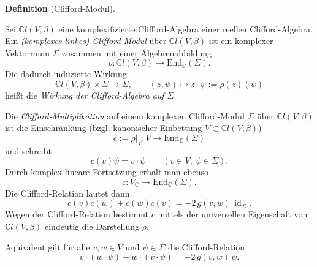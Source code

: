 \documentclass[10pt, letterpaper]{article}
\newcommand{\id}{\operatorname{id}}
\newcommand{\C}{\mathbb{C}}
\newcommand{\End}{\mathrm{End}}
\newcommand{\CustomHeading}[3]{%
  \par\medskip\noindent%
  \textbf{#1 #2} \textnormal{(#3)}.\enskip%
}
\newenvironment{DEF}[2]{\CustomHeading{Definition}{#1}{#2}}{}
\begin{document}
\begin{DEF}{}{Clifford-Modul}
Sei $\C l(V,\beta)$ eine komplexifizierte Clifford-Algebra einer reellen Clifford-Algebra. Ein \emph{(komplexes linkes) Clifford-Modul} über $\C l(V,\beta)$ ist ein komplexer Vektorraum $\Sigma$
zusammen mit einer Algebrenabbildung
\[
\rho:\C l(V,\beta)\longrightarrow \End_{\C}(\Sigma).
\]
Die dadurch induzierte Wirkung
\[
\C l(V,\beta)\times \Sigma\longrightarrow \Sigma,\qquad
(z,\psi)\longmapsto z\cdot \psi:=\rho(z)(\psi)
\]
heißt die \emph{Wirkung der Clifford-Algebra auf $\Sigma$}.

Die \emph{Clifford-Multiplikation} auf einem komplexen Clifford-Modul $\Sigma$ über
$\C l(V,\beta)$ ist die Einschränkung (bzgl. kanonischer Einbettung $V\subset \C l(V,\beta)$)
\[
c:=\rho|_V:V\to \End_{\C}(\Sigma)
\]
und schreibt
\[
c(v)\psi=v\cdot\psi
\qquad (v\in V,\ \psi\in\Sigma).
\]
Durch komplex-lineare Fortsetzung erhält man ebenso
\[
c:V_{\C}\to \End_{\C}(\Sigma).
\]
Die Clifford-Relation lautet dann
\[
c(v)c(w)+c(w)c(v)=-2\,g(v,w)\,\id_{\Sigma}.
\]
Wegen der Clifford-Relation bestimmt $c$ mittels der universellen Eigenschaft von $\C l(V, \beta)$ eindeutig die Darstellung $\rho$.


{\color{blue} Äquivalent gilt für alle $v,w\in V$ und $\psi\in \Sigma$ die Clifford-Relation}
\[
v\cdot (w\cdot \psi)+w\cdot (v\cdot \psi)=-2\,g(v,w)\,\psi.
\]
\end{DEF}


  
\end{document}
